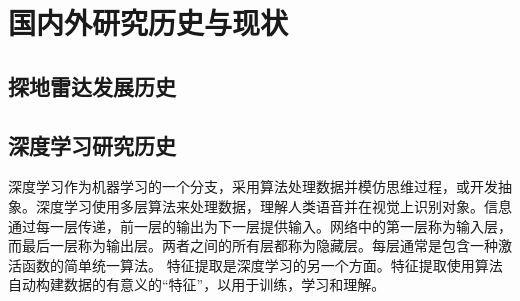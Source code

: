 \section{国内外研究历史与现状}
\subsection{探地雷达发展历史}

\subsection{深度学习研究历史}
深度学习作为机器学习的一个分支，采用算法处理数据并模仿思维过程，或开发抽象。深度学习使用多层算法来处理数据，理解人类语音并在视觉上识别对象。信息通过每一层传递，前一层的输出为下一层提供输入。网络中的第一层称为输入层，而最后一层称为输出层。两者之间的所有层都称为隐藏层。每层通常是包含一种激活函数的简单统一算法。
特征提取是深度学习的另一个方面。特征提取使用算法自动构建数据的有意义的“特征”，以用于训练，学习和理解。

